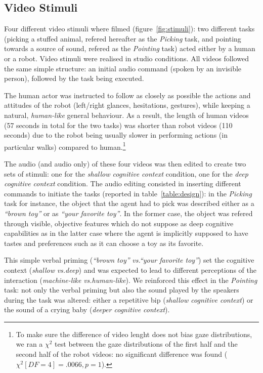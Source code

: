 \documentclass[lettersize, noapacite, twoside, HRI]{apa_HRI}
\newcommand{\vs}{\textit{vs.}\xspace}
\begin{document}
\subsection{Video Stimuli}

Four different video stimuli where filmed (figure~\ref{fig:stimuli}): two
different tasks (picking a stuffed animal, refered hereafter as the
\emph{Picking} task, and pointing towards a source of sound, refered as the
\emph{Pointing} task) acted either by a human or a robot. Video stimuli were
realised in studio conditions. All videos followed the same simple structure: an
initial audio command (spoken by an invisible person), followed by the task
being executed.

The human actor was instructed to follow as closely as possible the actions and
attitudes of the robot (left/right glances, hesitations, gestures), while keeping a
natural, \emph{human-like} general behaviour. As a result, the length of human videos
(57 seconds in total for the two tasks) was shorter than robot videos (110
seconds) due to the robot being usually slower in performing actions (in
particular walks) compared to human.\footnote{To make sure the difference of
video lenght does not bias gaze distributions, we ran a $\chi^2$ test between
the gaze distributions of the first half and the second half of the robot
videos: no significant difference was found ($\chi^2[DF=4]=.0066, p=1$).}

The audio (and audio only) of these four videos was then edited to create two
sets of stimuli: one for the \emph{shallow cognitive context} condition, one for
the \emph{deep cognitive context} condition. The audio editing consisted in
inserting different commands to initiate the tasks (reported in
table~\ref{table:design}): in the \emph{Picking} task for instance, the object
that the agent had to pick was described either as a \emph{``brown toy''} or as
\emph{``your favorite toy''}. In the former case, the object was refered through
visible, objective features which do not suppose as deep cognitive capabilities
as in the latter case where the agent is implicitly supposed to have
tastes and preferences such as it can choose a toy as its favorite.

This simple verbal priming (\emph{``brown toy''} \vs \emph{``your favorite
toy''}) set the cognitive context (\emph{shallow} \vs \emph{deep}) and was
expected to lead to different perceptions of the interaction
(\emph{machine-like} \vs \emph{human-like}). We reinforced this effect in the
\emph{Pointing} task: not only the verbal priming but also the sound played by the
speakers during the task was altered: either a repetitive bip (\emph{shallow
cognitive context}) or the sound of a crying baby (\emph{deeper cognitive
context}).
\end{document}
